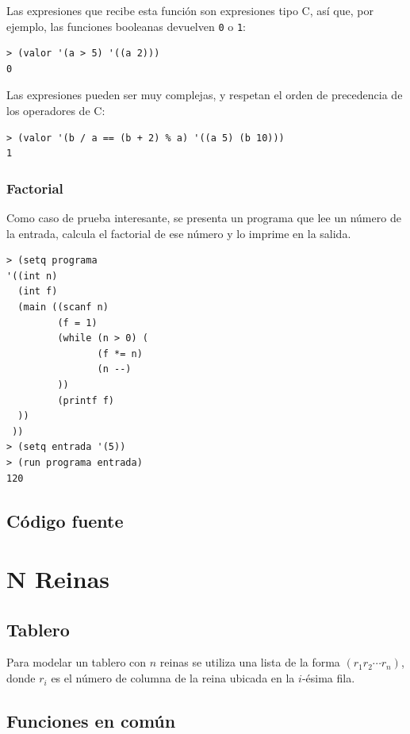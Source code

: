 \documentclass[12pt,titlepage]{article}
\begin{document}
Las expresiones que recibe esta función son expresiones tipo C, así que, por ejemplo, las funciones booleanas devuelven \lstinline|0| o \lstinline|1|:
\begin{lstlisting}
> (valor '(a > 5) '((a 2)))
0
\end{lstlisting}

Las expresiones pueden ser muy complejas, y respetan el orden de precedencia de los operadores de C:
\begin{lstlisting}
> (valor '(b / a == (b + 2) % a) '((a 5) (b 10)))
1
\end{lstlisting}

\subsubsection{Factorial}

Como caso de prueba interesante, se presenta un programa que lee un número de la entrada, calcula el factorial de ese número y lo imprime en la salida.
\begin{lstlisting}
> (setq programa 
'((int n)
  (int f)
  (main ((scanf n)
         (f = 1)
         (while (n > 0) (
                (f *= n)
                (n --)
         ))
         (printf f)
  ))
 ))
> (setq entrada '(5))
> (run programa entrada)
120
\end{lstlisting}

\subsection{Código fuente}



\section{N Reinas}

\subsection{Tablero}

Para modelar un tablero con $n$ reinas se utiliza una lista de la forma $(r_1 r_2 \cdots r_n)$, donde $r_i$ es el número de columna de la reina ubicada en la $i$-ésima fila.

\subsection{Funciones en común}
\end{document}
